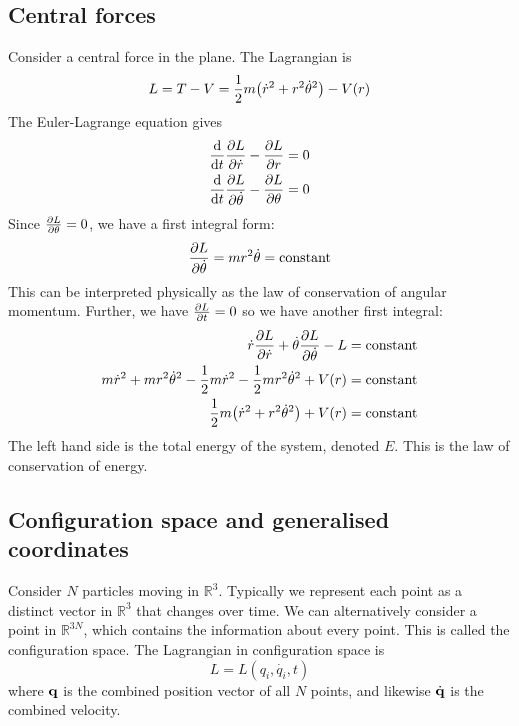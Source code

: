 \subsection{Central forces}
\begin{example}
	Consider a central force in the plane.
	The Lagrangian is
	\[
		L = T - V = \frac{1}{2}m\qty(\dot r^2 + r^2 \dot \theta^2) - V(r)
	\]
	The Euler-Lagrange equation gives
	\begin{align*}
		\dv{t}\pdv{L}{\dot r} - \pdv{L}{r}           & = 0 \\
		\dv{t}\pdv{L}{\dot \theta} - \pdv{L}{\theta} & = 0
	\end{align*}
	Since \( \pdv{L}{\theta} = 0 \), we have a first integral form:
	\[
		\pdv{L}{\dot \theta} = mr^2 \dot \theta = \text{constant}
	\]
	This can be interpreted physically as the law of conservation of angular momentum.
	Further, we have \( \pdv{L}{t} = 0 \) so we have another first integral:
	\begin{align*}
		\dot r \pdv{L}{\dot r} + \dot\theta \pdv{L}{\dot\theta} - L                              & = \text{constant} \\
		m\dot r^2 + mr^2\dot\theta^2 - \frac{1}{2}m\dot r^2 - \frac{1}{2}mr^2\dot\theta^2 + V(r) & = \text{constant} \\
		\frac{1}{2} m \qty( \dot r^2 + r^2\dot\theta^2 ) + V(r)                                  & = \text{constant}
	\end{align*}
	The left hand side is the total energy of the system, denoted \( E \).
	This is the law of conservation of energy.
\end{example}

\subsection{Configuration space and generalised coordinates}
\begin{example}
	Consider \( N \) particles moving in \( \mathbb R^3 \).
	Typically we represent each point as a distinct vector in \( \mathbb R^3 \) that changes over time.
	We can alternatively consider a point in \( \mathbb R^{3N} \), which contains the information about every point.
	This is called the configuration space.
	The Lagrangian in configuration space is
	\[
		L = L(q_i, \dot {q_i}, t)
	\]
	where \( \vb q \) is the combined position vector of all \( N \) points, and likewise \( \dot{\vb q} \) is the combined velocity.
\end{example}

